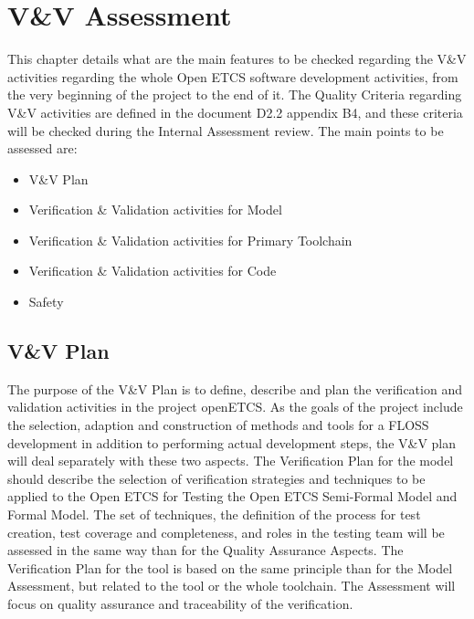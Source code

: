 \documentclass{template/openetcs_article}
\begin{document}
\section{V\&V Assessment}
This chapter details what are the main features to be checked regarding the V\&V activities regarding the whole Open ETCS software development activities, from the very beginning of the project to the end of it.
The Quality Criteria regarding V\&V activities are defined in the document D2.2 appendix B4, and these criteria will be checked during the Internal Assessment review. The main points to be assessed are:
\begin{itemize}
\item V\&V Plan
\item Verification \& Validation activities for Model
\item Verification \& Validation activities for Primary Toolchain
\item Verification \& Validation activities for Code
\item Safety
\end{itemize}

\subsection{V\&V Plan}
The purpose of the V\&V Plan is to define, describe and plan the verification and validation activities in the project openETCS. As the goals of the project include the selection, adaption and construction of methods and tools for a FLOSS development in addition to performing actual development steps, the V\&V plan will deal separately with these two aspects.
The Verification Plan for the model should describe the selection of verification strategies and techniques to be applied to the Open ETCS for Testing the Open ETCS Semi-Formal Model and Formal Model. The set of techniques, the definition of the process for test creation, test coverage and completeness, and roles in the testing team will be assessed in the same way than for the Quality Assurance Aspects.
The Verification Plan for the tool is based on the same principle than for the Model Assessment, but related to the tool or the whole toolchain. The Assessment will focus on quality assurance and traceability of the verification.
\end{document}
